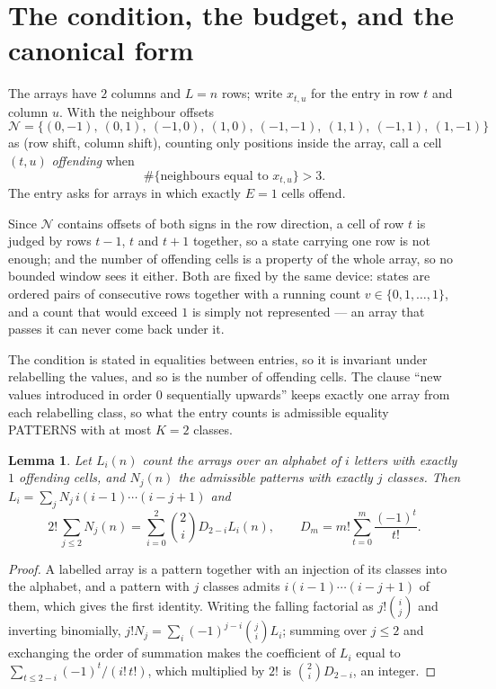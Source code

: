 \documentclass[11pt,a4paper]{article}
\theoremstyle{plain}
\newtheorem{lemma}[theorem]{Lemma}
\theoremstyle{definition}
\begin{document}
\section{The condition, the budget, and the canonical form}

The arrays have $2$ columns and $L=n$ rows; write $x_{t,u}$ for the entry in
row $t$ and column $u$. With the neighbour offsets
\[
\mathcal N=\{(0,-1),\ (0,1),\ (-1,0),\ (1,0),\ (-1,-1),\ (1,1),\ (-1,1),\ (1,-1)\}
\]
as (row shift, column shift), counting only positions inside the array, call a cell
$(t,u)$ \emph{offending} when
\[
\#\{\text{neighbours equal to }x_{t,u}\}>3 .
\]
The entry asks for arrays in which exactly $E=1$ cells offend.

Since $\mathcal N$ contains offsets of both signs in the row direction, a cell of row
$t$ is judged by rows $t-1$, $t$ and $t+1$ together, so a state carrying one row is not
enough; and the number of offending cells is a property of the whole array, so no bounded
window sees it either. Both are fixed by the same device: states are ordered pairs of
consecutive rows together with a running count $v\in\{0,1,\dots,1\}$, and a count that
would exceed $1$ is simply not represented --- an array that passes it can never come back
under it.

The condition is stated in equalities between entries, so it is invariant under relabelling
the values, and so is the number of offending cells. The clause ``new values introduced in
order $0$ sequentially upwards'' keeps exactly one array from each relabelling class, so what
the entry counts is admissible equality PATTERNS with at most $K=2$ classes.

\begin{lemma}\label{lem:inv}
Let $L_i(n)$ count the arrays over an alphabet of $i$ letters with exactly $1$ offending
cells, and $N_j(n)$ the admissible patterns with exactly $j$ classes. Then
$L_i=\sum_j N_j\,i(i-1)\cdots(i-j+1)$ and
\[
2!\,\sum_{j\le2}N_j(n)=\sum_{i=0}^{2}\binom{2}{i}D_{2-i}L_i(n),
\qquad D_m=m!\sum_{t=0}^{m}\frac{(-1)^t}{t!} .
\]
\end{lemma}

\begin{proof}
A labelled array is a pattern together with an injection of its classes into the alphabet,
and a pattern with $j$ classes admits $i(i-1)\cdots(i-j+1)$ of them, which gives the first
identity. Writing the falling factorial as $j!\binom{i}{j}$ and inverting binomially,
$j!N_j=\sum_i(-1)^{j-i}\binom{j}{i}L_i$; summing over $j\le2$ and exchanging the
order of summation makes the coefficient of $L_i$ equal to
$\sum_{t\le2-i}(-1)^t/(i!\,t!)$, which multiplied by $2!$ is
$\binom{2}{i}D_{2-i}$, an integer.
\end{proof}
\end{document}
